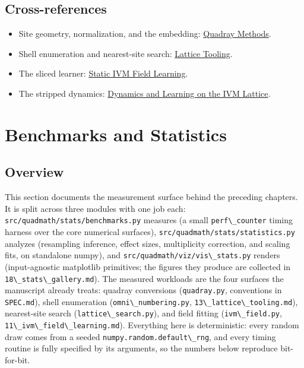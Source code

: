 \documentclass[
  10pt,
]{article}
\newcommand{\passthrough}[1]{#1}
\providecommand{\tightlist}{%
  \setlength{\itemsep}{0pt}\setlength{\parskip}{0pt}}
\begin{document}
\subsection{Cross-references}\label{cross-references-3}

\begin{itemize}
\tightlist
\item
  Site geometry, normalization, and the embedding:
  \href{03_quadray_methods.md}{Quadray Methods}.
\item
  Shell enumeration and nearest-site search:
  \href{13_lattice_tooling.md}{Lattice Tooling}.
\item
  The sliced learner: \href{11_ivm_field_learning.md}{Static IVM Field
  Learning}.
\item
  The stripped dynamics: \href{12_ivm_dynamics.md}{Dynamics and Learning
  on the IVM Lattice}.
\end{itemize}

\newpage

\section{Benchmarks and Statistics}\label{benchmarks-and-statistics}

\subsection{Overview}\label{overview-10}

This section documents the measurement surface behind the preceding
chapters. It is split across three modules with one job each:
\passthrough{\lstinline!src/quadmath/stats/benchmarks.py!} measures (a
small \passthrough{\lstinline!perf\_counter!} timing harness over the
core numerical surfaces),
\passthrough{\lstinline!src/quadmath/stats/statistics.py!} analyzes
(resampling inference, effect sizes, multiplicity correction, and
scaling fits, on standalone numpy), and
\passthrough{\lstinline!src/quadmath/viz/vis\_stats.py!} renders
(input-agnostic matplotlib primitives; the figures they produce are
collected in \passthrough{\lstinline!18\_stats\_gallery.md!}). The
measured workloads are the four surfaces the manuscript already treats:
quadray conversions (\passthrough{\lstinline!quadray.py!}, conventions
in \passthrough{\lstinline!SPEC.md!}), shell enumeration
(\passthrough{\lstinline!omni\_numbering.py!},
\passthrough{\lstinline!13\_lattice\_tooling.md!}), nearest-site search
(\passthrough{\lstinline!lattice\_search.py!}), and field fitting
(\passthrough{\lstinline!ivm\_field.py!},
\passthrough{\lstinline!11\_ivm\_field\_learning.md!}). Everything here
is deterministic: every random draw comes from a seeded
\passthrough{\lstinline!numpy.random.default\_rng!}, and every timing
routine is fully specified by its arguments, so the numbers below
reproduce bit-for-bit.
\end{document}
